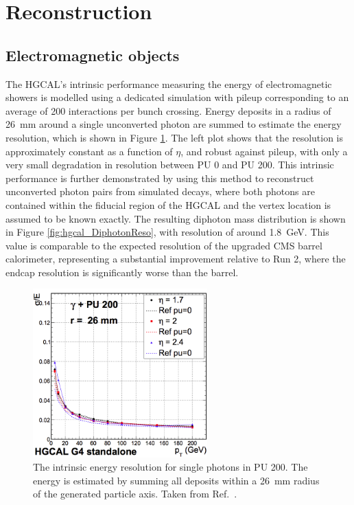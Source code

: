 \section{Reconstruction}

\subsection{Electromagnetic objects}

The HGCAL's intrinsic performance measuring the energy of electromagnetic showers is modelled using a dedicated simulation with pileup corresponding to an average of 200 interactions per bunch crossing. 
Energy deposits in a radius of \SI{26}{mm} around a single unconverted photon are summed to estimate the energy resolution, which is shown in Figure \ref{fig:hgcal_PhotonReso}. %
The left plot shows that the resolution is approximately constant as a function of $\eta$, and robust against pileup, with only a very small degradation in resolution between PU 0 and PU 200.
This intrinsic performance is further demonstrated by using this method to reconstruct unconverted photon pairs from simulated \Hgg decays, 
where both photons are contained within the fiducial region of the HGCAL and the vertex location is assumed to be known exactly. 
The resulting diphoton mass distribution is shown in Figure \ref{fig:hgcal_DiphotonReso}, with resolution of around \SI{1.8}{GeV}.
This value is comparable to the expected resolution of the upgraded CMS barrel calorimeter, 
representing a substantial improvement relative to Run 2, where the endcap resolution is significantly worse than the barrel. %

\begin{figure}[h!]
  \centering
  \includegraphics[width=0.6\textwidth]{Figures/HGCAL/SinglePhotonReso.png}
  \caption[HGCAL photon energy resolution.]
  {
    The intrinsic energy resolution for single photons in PU 200. 
    The energy is estimated by summing all deposits within a \SI{26}{mm} radius 
    of the generated particle axis. 
    Taken from Ref.~\cite{HGCAL}.
  }
  \label{fig:hgcal_PhotonReso}
\end{figure}

